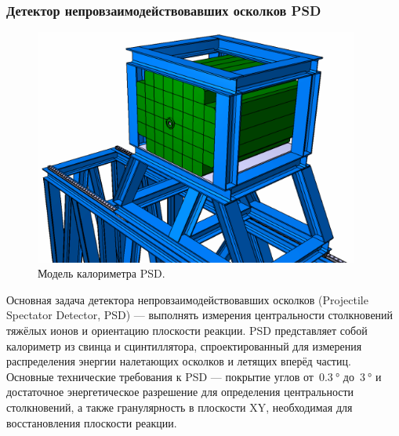 \subsubsection{Детектор непровзаимодействовавших осколков PSD}\label{sec:secPSD}

\begin{minipage}[t]{0.495\textwidth}
\begin{figure}[H]
\centering
\includegraphics[width=0.95\textwidth]{pictures/CBM_PSD_model_new.png}
\caption{Модель калориметра PSD.}
\label{fig:PSD}
\end{figure}
\end{minipage}
\begin{minipage}[t]{0.495\textwidth}
Основная задача детектора непровзаимодействовавших осколков (Projectile Spectator Detector, PSD) --- выполнять измерения центральности столкновений тяжёлых ионов и ориентацию плоскости реакции. PSD представляет собой калориметр из свинца и сцинтиллятора, спроектированный для измерения распределения энергии налетающих осколков и летящих вперёд частиц. Основные технические требования к PSD --- покрытие углов от~$\SI{0.3}{\degree}$ до~$\SI{3}{\degree}$ и достаточное энергетическое разрешение для определения центральности столкновений, а также гранулярность в плоскости XY, необходимая для восстановления плоскости реакции. \\
\end{minipage}

